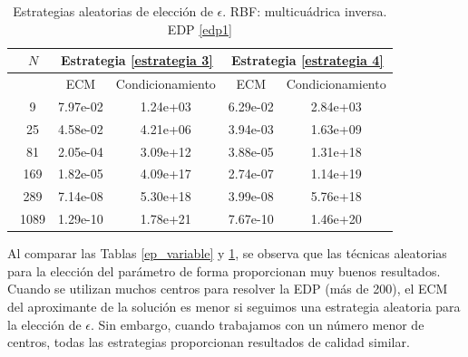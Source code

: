 \documentclass[11pt,a4paper]{article}
\begin{document}
\begin{table}[H]
\centering
\caption{Estrategias aleatorias de elección de $\epsilon$. RBF: multicuádrica inversa. EDP \ref{edp1} }
\centering
\begin{tabular}{|c|cc|cc|}
\hline
\ $N$ &\multicolumn{2}{|c|}{Estrategia \ref{estrategia 3}}& \multicolumn{2}{|c|}{Estrategia \ref{estrategia 4}} \\
\hline
\  & ECM & Condicionamiento & ECM & Condicionamiento \\
\hline
\ 9 & 7.97e-02 & 1.24e+03 & 6.29e-02 & 2.84e+03\\
\ 25 & 4.58e-02 & 4.21e+06 & 3.94e-03 & 1.63e+09\\
\ 81 & 2.05e-04& 3.09e+12 &   3.88e-05 & 1.31e+18 \\
\ 169 & 1.82e-05 & 4.09e+17 & 2.74e-07 & 1.14e+19\\
\ 289 & 7.14e-08 & 5.30e+18 & 3.99e-08 & 5.76e+18\\
\ 1089 & 1.29e-10 & 1.78e+21 & 7.67e-10 & 1.46e+20\\
\hline

\end{tabular}
\label{eps aleatorio}
\end{table}
 Al comparar las Tablas \ref{ep_variable} y \ref{eps aleatorio}, se observa que las técnicas aleatorias para la elección del parámetro de forma proporcionan muy buenos resultados. Cuando se utilizan muchos centros para resolver la EDP (más de 200), el ECM del aproximante de la solución es menor si seguimos una estrategia aleatoria para la elección de $\epsilon$. Sin embargo, cuando trabajamos con un número menor de centros, todas las estrategias proporcionan resultados de calidad similar. 
\end{document}
